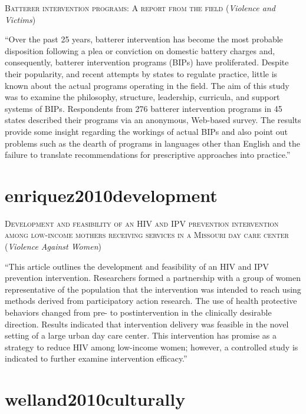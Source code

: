 \documentclass[]{tufte-handout}
\begin{document}
\textsc{\large{Batterer intervention programs: A report from the field}}
(\emph{Violence and Victims})

``Over the past 25 years, batterer intervention has become the most
probable disposition following a plea or conviction on domestic battery
charges and, consequently, batterer intervention programs (BIPs) have
proliferated. Despite their popularity, and recent attempts by states to
regulate practice, little is known about the actual programs operating
in the field. The aim of this study was to examine the philosophy,
structure, leadership, curricula, and support systems of BIPs.
Respondents from 276 batterer intervention programs in 45 states
described their programs via an anonymous, Web-based survey. The results
provide some insight regarding the workings of actual BIPs and also
point out problems such as the dearth of programs in languages other
than English and the failure to translate recommendations for
prescriptive approaches into practice.''

\section{\texorpdfstring{\textcolor[HTML]{5b0057}{enriquez2010development}}{}}\label{section-14}

\textsc{\large{Development and feasibility of an HIV and IPV prevention intervention among low-income mothers receiving services in a Missouri day care center}}
(\emph{Violence Against Women})

``This article outlines the development and feasibility of an HIV and
IPV prevention intervention. Researchers formed a partnership with a
group of women representative of the population that the intervention
was intended to reach using methods derived from participatory action
research. The use of health protective behaviors changed from pre- to
postintervention in the clinically desirable direction. Results
indicated that intervention delivery was feasible in the novel setting
of a large urban day care center. This intervention has promise as a
strategy to reduce HIV among low-income women; however, a controlled
study is indicated to further examine intervention efficacy.''

\section{\texorpdfstring{\textcolor[HTML]{5b0057}{welland2010culturally}}{}}\label{section-15}
\end{document}
